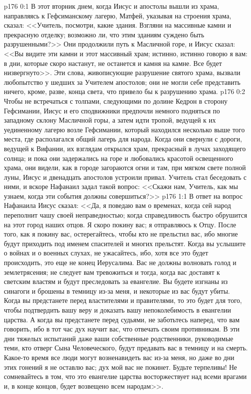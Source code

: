 \vs p176 0:1 В этот вторник днем, когда Иисус и апостолы вышли из храма, направляясь к Гефсиманскому лагерю, Матфей, указывая на строения храма, сказал: <<Учитель, посмотри, какие здания. Взгляни на массивные камни и прекрасную отделку; возможно ли, что этим зданиям суждено быть разрушенными?>> Они продолжили путь к Масличной горе, и Иисус сказал: <<Вы видите эти камни и этот массивный храм; истинно, истинно говорю я вам: в дни, которые скоро настанут, не останется и камня на камне. Все будет низвергнуто>>. Эти слова, живописующие разрушение святого храма, вызвали любопытство у шедших за Учителем апостолов; они не могли себе представить ничего, кроме, разве, конца света, что привело бы к разрушению храма.
\vs p176 0:2 Чтобы не встречаться с толпами, следующими по долине Кедрон в сторону Гефсимании, Иисус и его сподвижники предпочли немного подняться по западному склону Масличной горы, а затем идти тропой, ведущей к их уединенному лагерю возле Гефсимании, который находился несколько выше того места, где располагался общий лагерь для народа. Когда они свернули с дороги, ведущей к Вифании, их взглядам открылся храм, прекрасный в лучах заходящего солнца; и пока они задержались на горе и любовались красотой освещенного храма, они видели, как в городе загораются огни и там, при мягком свете полной луны, Иисус и двенадцать апостолов устроили привал. Учитель стал беседовать с ними, и вскоре Нафанаил задал такой вопрос: <<Скажи нам, Учитель, как мы узнаем, когда эти события должны совершиться?>>
\vs p176 1:1 В ответ на вопрос Нафанаила Иисус сказал: <<Да, я поведаю вам о временах, когда сей народ переполнит чашу своей неправедностью; когда справедливость быстро обрушится на этот город наших отцов. Я скоро покину вас; я отправляюсь к Отцу. После того, как я покину вас, остерегайтесь, чтобы кто не прельстил вас, ибо многие будут приходить под именем спасителей и многих прельстят. Когда вы услышите о войнах и о военных слухах, не ужасайтесь, ибо, хотя все это будет происходить, это еще не конец Иерусалима. Вас не должны волновать голод и землетрясения; не следует вам тревожиться и тогда, когда вас доставят к светским властям и будут преследовать за евангелие. Вы будете изгнаны из синагоги и брошены в темницу из\hyp{}за меня, и некоторые из вас будут убиты. Когда вы предстанете перед властителями и правителями, то это будет для того, чтобы подтвердить вашу веру и доказать вашу непоколебимость в евангелии царства. А когда вы предстанете перед судьями, не заботьтесь наперед, что вам говорить, ибо в тот час дух научит вас, что отвечать своим противникам. В эти дни тяжелых испытаний даже ваши собственные родственники, руководимые теми, кто отверг Сына Человеческого, будут предавать вас в темницу и на смерть. Какое\hyp{}то время все люди могут возненавидеть вас из\hyp{}за меня, но даже во дни этих гонений я не оставлю вас; дух мой вас не покинет. Будьте терпеливы! Не сомневайтесь в том, что это евангелие царства восторжествует над всеми врагами и, в конце концов, будет возвещено всем народам>>.
